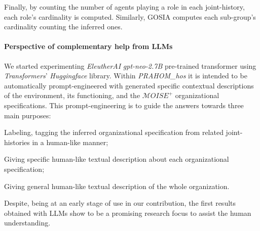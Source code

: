 \documentclass[runningheads]{llncs}
\newcounter{relation}
\begin{document}
Finally, by counting the number of agents playing a role in each joint-history, each role's cardinality is computed. Similarly, GOSIA computes each sub-group's cardinality counting the inferred ones.

\paragraph{Perspective of complementary help from LLMs}

We started experimenting \emph{EleutherAI} \emph{gpt-neo-2.7B} pre-trained transformer using \emph{Transformers}' \emph{Huggingface} library. Within \emph{PRAHOM\_hos} it is intended to be automatically prompt-engineered with generated specific contextual descriptions of the environment, its functioning, and the $\mathcal{M}OISE^+$ organizational specifications. This prompt-engineering is to guide the answers towards three main purposes:
\begin{enumerate*}[label=\roman*),itemjoin={;\quad}]
    \item Labeling, tagging the inferred organizational specification from related joint-histories in a human-like manner;
    \item Giving specific human-like textual description about each organizational specification;
    \item Giving general human-like textual description of the whole organization.
\end{enumerate*}
Despite, being at an early stage of use in our contribution, the first results obtained with LLMs show to be a promising research focus to assist the human understanding.


%
%
%
%
\end{document}
